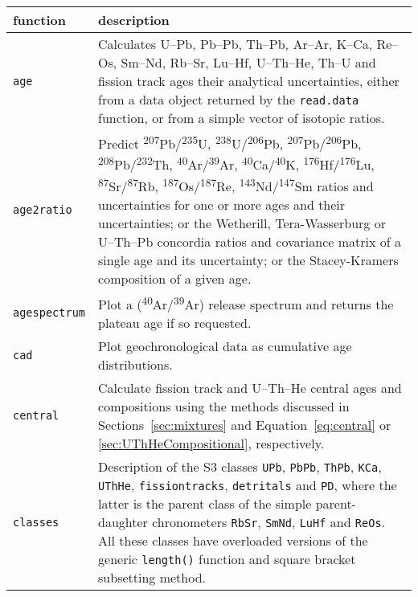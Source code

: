 \begin{refsection}
\begin{longtable}{@{}p{.2\linewidth}@{}p{.8\linewidth}@{}}
function & description \\ \hline

\texttt{age} & Calculates U--Pb, Pb--Pb, Th--Pb, Ar--Ar, K--Ca,
Re--Os, Sm--Nd, Rb--Sr, Lu--Hf, U--Th--He, Th--U and fission track
ages their analytical uncertainties, either from a data object
returned by the \texttt{read.data} function, or from a simple vector
of isotopic ratios. \\

\texttt{age2ratio} & Predict
\textsuperscript{207}Pb/\textsuperscript{235}U,
\textsuperscript{238}U/\textsuperscript{206}Pb,
\textsuperscript{207}Pb/\textsuperscript{206}Pb,
\textsuperscript{208}Pb/\textsuperscript{232}Th,
\textsuperscript{40}Ar/\textsuperscript{39}Ar,
\textsuperscript{40}Ca/\textsuperscript{40}K,
\textsuperscript{176}Hf/\textsuperscript{176}Lu,
\textsuperscript{87}Sr/\textsuperscript{87}Rb,
\textsuperscript{187}Os/\textsuperscript{187}Re,
\textsuperscript{143}Nd/\textsuperscript{147}Sm ratios and
uncertainties for one or more ages and their uncertainties; or the
Wetherill, Tera-Wasserburg or U--Th--Pb concordia ratios and
covariance matrix of a single age and its uncertainty; or the
Stacey-Kramers composition of a given age.\\

\texttt{agespectrum} & Plot a
(\textsuperscript{40}Ar/\textsuperscript{39}Ar) release spectrum and
returns the plateau age if so requested.\\

\texttt{cad} & Plot geochronological data as cumulative age
distributions.\\

\texttt{central} & Calculate fission track and U--Th--He central ages
and compositions using the methods discussed in
Sections~\ref{sec:mixtures} and Equation~\ref{eq:central} or
\ref{sec:UThHeCompositional}, respectively.\\

\texttt{classes} & Description of the S3 classes \texttt{UPb},
\texttt{PbPb}, \texttt{ThPb}, \texttt{KCa}, \texttt{UThHe},
\texttt{fissiontracks}, \texttt{detritals} and \texttt{PD}, where the
latter is the parent class of the simple parent-daughter chronometers
\texttt{RbSr}, \texttt{SmNd}, \texttt{LuHf} and \texttt{ReOs}. All
these classes have overloaded versions of the generic
\texttt{length()} function and square bracket subsetting method.\\


\end{longtable}
\end{refsection}
